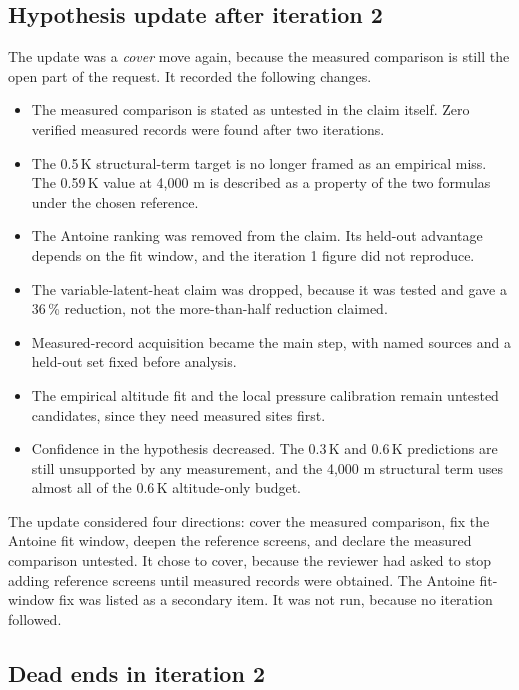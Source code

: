 \documentclass[11pt,letterpaper]{article}
\begin{document}
\subsection{Hypothesis update after iteration 2}

The update was a \emph{cover} move again, because the measured comparison is still the open part of the request. It recorded the following changes.
\begin{itemize}
\item The measured comparison is stated as untested in the claim itself. Zero verified measured records were found after two iterations.
\item The 0.5\,K structural-term target is no longer framed as an empirical miss. The 0.59\,K value at 4,000 m is described as a property of the two formulas under the chosen reference.
\item The Antoine ranking was removed from the claim. Its held-out advantage depends on the fit window, and the iteration 1 figure did not reproduce.
\item The variable-latent-heat claim was dropped, because it was tested and gave a 36\,\% reduction, not the more-than-half reduction claimed.
\item Measured-record acquisition became the main step, with named sources and a held-out set fixed before analysis.
\item The empirical altitude fit and the local pressure calibration remain untested candidates, since they need measured sites first.
\item Confidence in the hypothesis decreased. The 0.3\,K and 0.6\,K predictions are still unsupported by any measurement, and the 4,000 m structural term uses almost all of the 0.6\,K altitude-only budget.
\end{itemize}

The update considered four directions: cover the measured comparison, fix the Antoine fit window, deepen the reference screens, and declare the measured comparison untested. It chose to cover, because the reviewer had asked to stop adding reference screens until measured records were obtained. The Antoine fit-window fix was listed as a secondary item. It was not run, because no iteration followed.

\subsection{Dead ends in iteration 2}
\end{document}
